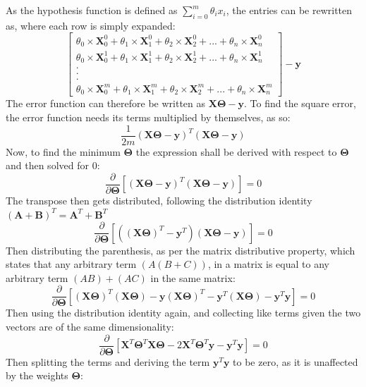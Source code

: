 \documentclass[a4paper,12pt]{article}
\begin{document}
As the hypothesis function is defined as \(\sum_{i=0}^m \theta_i x_i\), the entries can be rewritten as, where each row is simply expanded:
\[\begin{bmatrix} \theta_0 \times \boldsymbol{X}_0^0 + \theta_1 \times \boldsymbol{X}_1^0 + \theta_2 \times \boldsymbol{X}_2^0 + ... + \theta_n \times \boldsymbol{X}_n^0 \\ \theta_0 \times \boldsymbol{X}_0^1 + \theta_1 \times \boldsymbol{X}_1^1 + \theta_2 \times \boldsymbol{X}_2^1 + ... + \theta_n \times \boldsymbol{X}_n^1 \\ . \\ . \\ . \\ \theta_0 \times \boldsymbol{X}_0^m + \theta_1 \times \boldsymbol{X}_1^m + \theta_2 \times \boldsymbol{X}_2^m + ... + \theta_n \times \boldsymbol{X}_n^m \end{bmatrix} - \boldsymbol{y}\]
The error function can therefore be written as \(\boldsymbol{X\Theta} - \boldsymbol{y}\). To find the square error, the error function needs its terms multiplied by themselves, as so:
\[\frac{1}{2m}(\boldsymbol{X\Theta} - \boldsymbol{y})^T(\boldsymbol{X\Theta} - \boldsymbol{y})\]
Now, to find the minimum \(\boldsymbol{\Theta}\) the expression shall be derived with respect to \(\boldsymbol{\Theta}\) and then solved for \(0\):
\[\frac{\partial}{\partial\boldsymbol{\Theta}}[(\boldsymbol{X\Theta} - \boldsymbol{y})^T(\boldsymbol{X\Theta} - \boldsymbol{y})] = 0\]
The transpose then gets distributed, following the distribution identity \((\boldsymbol{A} + \boldsymbol{B})^T = \boldsymbol{A}^T + \boldsymbol{B}^T\)
\[\frac{\partial}{\partial\boldsymbol{\Theta}}[((\boldsymbol{X\Theta})^T - \boldsymbol{y}^T)(\boldsymbol{X\Theta} - \boldsymbol{y})] = 0\]
Then distributing the parenthesis, as per the matrix distributive property, which states that any arbitrary term $(A(B+C))$, in a matrix is equal to any arbitrary term $(AB) + (AC)$ in the same matrix:
\[\frac{\partial}{\partial\boldsymbol{\Theta}}[(\boldsymbol{X\Theta})^T(\boldsymbol{X\Theta}) - \boldsymbol{y}(\boldsymbol{X\Theta})^T - \boldsymbol{y}^T(\boldsymbol{X\Theta}) - \boldsymbol{y}^T\boldsymbol{y}] = 0\]
Then using the distribution identity again, and collecting like terms given the two vectors are of the same dimensionality:
\[\frac{\partial}{\partial\boldsymbol{\Theta}}[\boldsymbol{X}^T\boldsymbol{\Theta}^T\boldsymbol{X\Theta} - 2\boldsymbol{X}^T\boldsymbol{\Theta}^T\boldsymbol{y} - \boldsymbol{y}^T\boldsymbol{y}] = 0\]
Then splitting the terms and deriving the term $\boldsymbol{y}^T\boldsymbol{y}$ to be zero, as it is unaffected by the weights $\boldsymbol{\Theta}$: 
\end{document}
